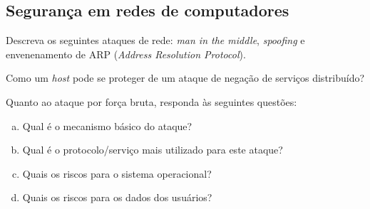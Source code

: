 \subsection*{Segurança em redes de computadores}

\exercise Descreva os seguintes ataques de rede: {\em man in the
  middle}, {\em spoofing} e envenenamento de ARP ({\em Address
  Resolution Protocol}).

\exercise Como um {\it host\/} pode se proteger de um 
ataque de negação de serviços distribuído?

\exercise Quanto ao ataque por força bruta, responda 
às seguintes questões:

\begin{enumerate}[a)]
\item Qual é o mecanismo básico do ataque?
\item Qual é o protocolo/serviço mais utilizado para este ataque?
\item Quais os riscos para o sistema operacional?
\item Quais os riscos para os dados dos usuários?
\end{enumerate}